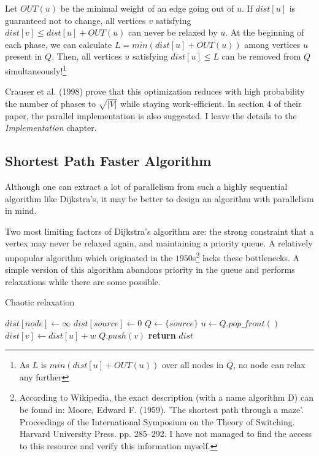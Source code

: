 \documentclass[12pt,a4paper,twoside,openright]{report}
\begin{document}
Let $OUT(u)$ be the minimal weight of an edge going out of $u$. If $dist[u]$ is guaranteed not to change, all vertices $v$ satisfying $dist[v] \leq dist[u] + OUT(u)$ can never be relaxed by $u$. At the beginning of each phase, we can calculate $L = min(dist[u] + OUT(u))$ among vertices $u$ present in $Q$. Then, all vertices $u$ satisfying $dist[u] \leq L$ can be removed from $Q$ simultaneously!\footnote{As $L$ is $min(dist[u] + OUT(u))$ over all nodes in $Q$, no node can relax any further}

Crauser et al. (1998)\cite{dijkstra} prove that this optimization reduces with high probability the number of phases to $\sqrt{|V|}$ while staying work-efficient. In section $4$ of their paper, the parallel implementation is also suggested. I leave the details to the \textit{Implementation} chapter.

\subsection{Shortest Path Faster Algorithm}
Although one can extract a lot of parallelism from such a highly sequential algorithm like Dijkstra's, it may be better to design an algorithm with parallelism in mind. 

Two most limiting factors of Dijkstra's algorithm are: the strong constraint that a vertex may never be relaxed again, and maintaining a priority queue. A relatively unpopular algorithm which originated in the $1950$s\footnote{According to Wikipedia, the exact description (with a name algorithm D) can be found in:  Moore, Edward F. (1959).  'The shortest path through a maze'.  Proceedings of the International Symposium on the Theory of Switching.  Harvard University Press.  pp.  285–292. I have not managed to find the access to this resource and verify this information myself.} lacks these bottlenecks. A simple version of this algorithm abandons priority in the queue and performs relaxations while there are some possible.

\begin{algorithm}
\caption{Chaotic relaxation}\label{chaotic}
\begin{algorithmic}[1]
    \State $dist[node] \gets \infty$
\EndFor
\State $dist[source] \gets 0$
\State $Q \gets \{source\}$ 
        \State $u \gets Q.pop\_front()$
            \State $dist[v] \gets dist[u] + w$
            \State $Q.push(v)$
        \EndIf
      \EndFor
    \EndWhile
\State \textbf{return} $dist$
\EndProcedure
\end{algorithmic}
\end{algorithm}
\end{document}
